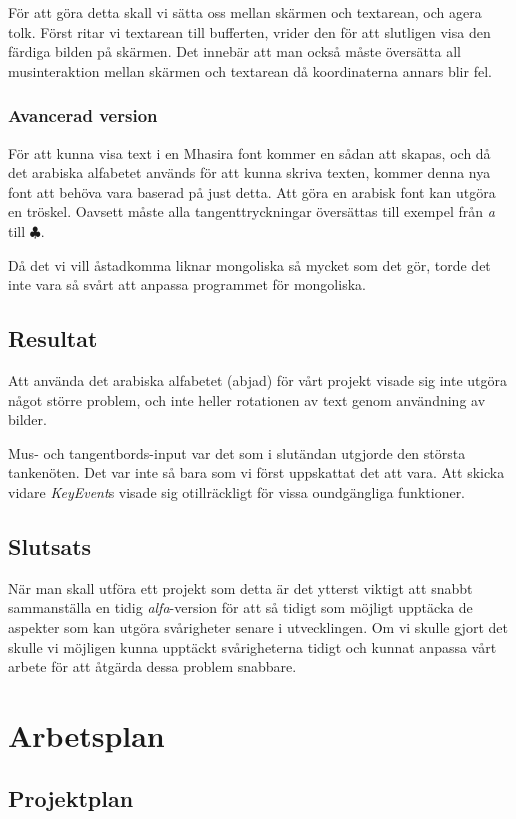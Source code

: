 \documentclass[a4paper,11p,twoside]{article}
\begin{document}
För att göra detta skall vi sätta oss mellan skärmen och textarean, och agera tolk. Först ritar vi textarean till bufferten, vrider den för att slutligen visa den färdiga bilden på skärmen. Det innebär att man också måste översätta all musinteraktion mellan skärmen och textarean då koordinaterna annars blir fel.

\subsubsection{Avancerad version}
För att kunna visa text i en Mhasira font kommer en sådan att skapas, och då det arabiska alfabetet används för att kunna skriva texten, kommer denna nya font att behöva vara baserad på just detta. Att göra en arabisk font kan utgöra en tröskel. Oavsett måste alla tangenttryckningar översättas till exempel från \emph{a} till $\clubsuit$. 

Då det vi vill åstadkomma liknar mongoliska så mycket som det gör, torde det inte vara så svårt att anpassa programmet för mongoliska.

\subsection{Resultat}
Att använda det arabiska alfabetet (abjad) för vårt projekt visade sig inte utgöra något större problem, och inte heller rotationen av text genom användning av bilder.

Mus- och tangentbords-input var det som i slutändan utgjorde den största tankenöten. Det var inte så bara som vi först uppskattat det att vara. Att skicka vidare \emph{KeyEvent}s visade sig otillräckligt för vissa oundgängliga funktioner.

\subsection{Slutsats}
När man skall utföra ett projekt som detta är det ytterst viktigt att snabbt sammanställa en tidig \emph{alfa}-version för att så tidigt som möjligt upptäcka de aspekter som kan utgöra svårigheter senare i utvecklingen. Om vi skulle gjort det skulle vi möjligen kunna upptäckt svårigheterna tidigt och kunnat anpassa vårt arbete för att åtgärda dessa problem snabbare.

\section{Arbetsplan}
\subsection{Projektplan}
\end{document}
